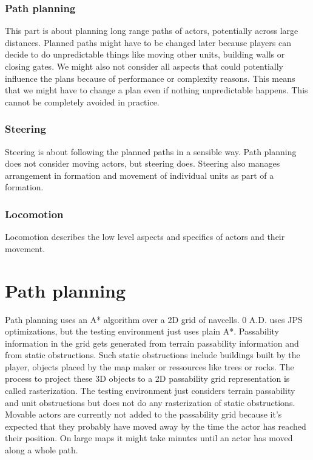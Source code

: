 \documentclass[a4paper,10pt]{article}
\begin{document}
\subsubsection{Path planning}
This part is about planning long range paths of actors, potentially across large distances.
Planned paths might have to be changed later because players can decide to do unpredictable things like moving other units, building walls or closing gates.
We might also not consider all aspects that could potentially influence the plans because of performance or complexity reasons.
This means that we might have to change a plan even if nothing unpredictable happens.
This cannot be completely avoided in practice.

\subsubsection{Steering}
Steering is about following the planned paths in a sensible way.
Path planning does not consider moving actors, but steering does.
Steering also manages arrangement in formation and movement of individual units as part of a formation.

\subsubsection{Locomotion}
Locomotion describes the low level aspects and specifics of actors and their movement.

\section{Path planning}

Path planning uses an A* algorithm over a 2D grid of navcells.
0 A.D. uses JPS optimizations, but the testing environment just uses plain A*.
Passability information in the grid gets generated from terrain passability information and from static obstructions.
Such static obstructions include buildings built by the player, objects placed by the map maker or ressources like trees or rocks.
The process to project these 3D objects to a 2D passability grid representation is called rasterization.
The testing environment just considers terrain passability and unit obstructions but does not do any rasterization of static obstructions.
Movable actors are currently not added to the passability grid because it's expected that they probably have moved away by the time the actor has reached their position.
On large maps it might take minutes until an actor has moved along a whole path.
\end{document}

